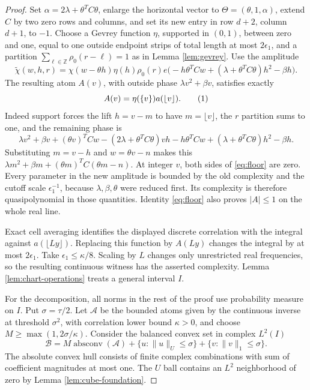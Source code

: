 \documentclass[11pt]{article}
\theoremstyle{definition}
\newcommand{\Z}{\mathbb Z}
\newcommand{\eqtag}[1]{\refstepcounter{equation}\tag{\theequation}\label{#1}}
\numberwithin{equation}{section}
\begin{document}
\begin{proof}
Set $\alpha=2\lambda+\theta^TC\theta$, enlarge the horizontal vector to $\Theta=(\theta,1,\alpha)$, extend $C$ by two zero rows and columns, and set its new entry in row $d+2$, column $d+1$, to $-1$. Choose a Gevrey function $\eta$, supported in $(0,1)$, between zero and one, equal to one outside endpoint strips of total length at most $2\epsilon_1$, and a partition $\sum_{\ell\in\Z}\rho_0(r-\ell)=1$ as in Lemma \ref{lem:gevrey}. Use the amplitude
\[
 \widetilde\chi(w,h,r)=\chi(w-\theta h)\eta(h)\rho_0(r)
 e\bigl(-h\theta^TCw+(\lambda+\theta^TC\theta)h^2-\beta h\bigr).
\]
The resulting atom $A(v)$, with outside phase $\lambda v^2+\beta v$, satisfies exactly
\[
 A(v)=\eta(\{v\})a(\lfloor v\rfloor).
 \eqtag{eq:floor}
\]
Indeed support forces the lift $h=v-m$ to have $m=\lfloor v\rfloor$, the $r$ partition sums to one, and the remaining phase is
\[
 \lambda v^2+\beta v+(\theta v)^TCw-(2\lambda+\theta^TC\theta)vh
 -h\theta^TCw+(\lambda+\theta^TC\theta)h^2-\beta h.
\]
Substituting $m=v-h$ and $w=\theta v-n$ makes this $\lambda m^2+\beta m+(\theta m)^TC(\theta m-n)$. At integer $v$, both sides of \eqref{eq:floor} are zero. Every parameter in the new amplitude is bounded by the old complexity and the cutoff scale $\epsilon_1^{-1}$, because $\lambda,\beta,\theta$ were reduced first. Its complexity is therefore quasipolynomial in those quantities. Identity \eqref{eq:floor} also proves $|A|\le1$ on the whole real line.

Exact cell averaging identifies the displayed discrete correlation with the integral against $a(\lfloor Ly\rfloor)$. Replacing this function by $A(Ly)$ changes the integral by at most $2\epsilon_1$. Take $\epsilon_1\le\kappa/8$. Scaling by $L$ changes only unrestricted real frequencies, so the resulting continuous witness has the asserted complexity. Lemma \ref{lem:chart-operations} treats a general interval $I$.

For the decomposition, all norms in the rest of the proof use probability measure on $I$. Put $\sigma=\tau/2$. Let $\mathcal A$ be the bounded atoms given by the continuous inverse at threshold $\sigma^2$, with correlation lower bound $\kappa>0$, and choose $M\ge\max(1,2\sigma/\kappa)$. Consider the balanced convex set in complex $L^2(I)$
\[
 \mathcal B=M\operatorname{absconv}(\mathcal A)
 +\{u:\|u\|_U\le\sigma\}
 +\{v:\|v\|_1\le\sigma\}.
\]
The absolute convex hull consists of finite complex combinations with sum of coefficient magnitudes at most one. The $U$ ball contains an $L^2$ neighborhood of zero by Lemma \ref{lem:cube-foundation}.


\end{proof}
\end{document}

